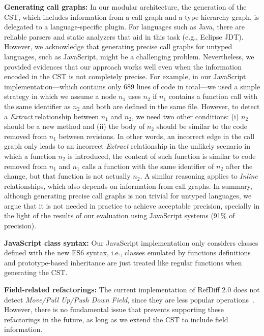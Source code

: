 \noindent\textbf{Generating call graphs:} In our modular architecture, the generation of the CST, which includes information from a call graph and a type hierarchy graph, is delegated to a language-specific plugin.
For languages such as Java, there are reliable parsers and static analyzers that aid in this task (e.g., Eclipse JDT).
However, we acknowledge that generating precise call graphs for untyped languages, such as JavaScript, might be a challenging problem.
Nevertheless, we provided evidences that our approach works well even when the information encoded in the CST is not completely precise.
For example, in our JavaScript implementation---which contains only 689 lines of code in total---we used a simple strategy in which we assume a node $n_1$ uses $n_2$ if $n_1$ contains a function call with the same identifier as $n_2$ and both are defined in the same file.
However, to detect a \emph{Extract} relationship between $n_1$ and $n_2$, we need two other conditions: (i) $n_2$ should be a new method and (ii) the body of $n_2$ should be similar to the code removed from $n_1$ between revisions.
In other words, an incorrect edge in the call graph only leads to an incorrect \emph{Extract} relationship in the unlikely scenario in which a function $n_2$ is introduced, the content of such function is similar to code removed from $n_1$ and $n_1$ calls a function with the same identifier of $n_2$ after the change, but that function is not actually $n_2$.
A similar reasoning applies to \emph{Inline} relationships, which also depends on information from call graphs.
In summary, although generating precise call graphs is non trivial for untyped languages, we argue that it is not needed in practice to achieve acceptable  precision, specially in the light of the results of our evaluation using JavaScript systems (91\% of precision).

\noindent\textbf{JavaScript class syntax:} Our JavaScript implementation only considers classes defined with the new ES6 syntax, i.e., classes emulated by  functions definitions and prototype-based inheritance are just treated like regular functions when generating the CST.

\noindent\textbf{Field-related refactorings:} The current implementation of RefDiff 2.0 does not detect \emph{Move/Pull Up/Push Down Field}, since they are less popular operations~\citep{fse2016-why-we-refactor}. However, there is no fundamental issue that prevents supporting these refactorings in the future, as long as we extend the CST to include field information.





